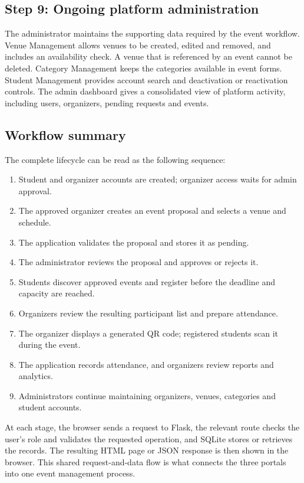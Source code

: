 \documentclass[11pt,a4paper]{article}
\begin{document}
\subsection{Step 9: Ongoing platform administration}
The administrator maintains the supporting data required by the event workflow. Venue
Management allows venues to be created, edited and removed, and includes an availability
check. A venue that is referenced by an event cannot be deleted. Category Management keeps
the categories available in event forms. Student Management provides account search and
deactivation or reactivation controls. The admin dashboard gives a consolidated view of
platform activity, including users, organizers, pending requests and events.

\subsection{Workflow summary}
The complete lifecycle can be read as the following sequence:
\begin{enumerate}[leftmargin=*,label=\textbf{\arabic*.}]
  \item Student and organizer accounts are created; organizer access waits for admin approval.
  \item The approved organizer creates an event proposal and selects a venue and schedule.
  \item The application validates the proposal and stores it as pending.
  \item The administrator reviews the proposal and approves or rejects it.
  \item Students discover approved events and register before the deadline and capacity are reached.
  \item Organizers review the resulting participant list and prepare attendance.
  \item The organizer displays a generated QR code; registered students scan it during the event.
  \item The application records attendance, and organizers review reports and analytics.
  \item Administrators continue maintaining organizers, venues, categories and student accounts.
\end{enumerate}
At each stage, the browser sends a request to Flask, the relevant route checks the user's role
and validates the requested operation, and SQLite stores or retrieves the records. The resulting
HTML page or JSON response is then shown in the browser. This shared request-and-data flow
is what connects the three portals into one event management process.
\end{document}
